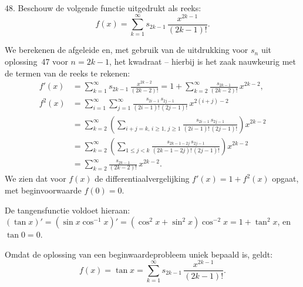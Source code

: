 \begin{problem}{48.}
    Beschouw de volgende functie uitgedrukt als reeks:
    \begin{equation*}
		f(x) = \textstyle\sum\limits_{k=1}^{\infty} s_{2k - 1}\, \frac{x^{2k - 1}}{(2k - 1)!}.
	\end{equation*}

    We berekenen de afgeleide en, met gebruik van de uitdrukking voor $s_n$ uit oplossing~47 voor $n = 2k - 1$, het kwadraat -- hierbij is het zaak nauwkeurig met de termen van de reeks te rekenen:
    \begin{equation*}
    \begin{split}
        f'(x)  & = \textstyle\sum\limits_{k=1}^{\infty} s_{2k - 1}\, \frac{x^{2k - 2}}{(2k - 2)!} = 1 + \textstyle\sum\limits_{k=2}^{\infty} \frac{s_{2k - 1}}{(2k - 2)!} \, x^{2k - 2}, \\
        f^2(x) & = \textstyle\sum\limits_{i=1}^{\infty} \textstyle\sum\limits_{j=1}^{\infty} \frac{s_{2i - 1}\, s_{2j - 1}}{(2i - 1)!\, (2j - 1)!} \, x^{2(i+j) - 2} \\
               & = \textstyle\sum\limits_{k=2}^{\infty} \left( \textstyle\sum\limits_{i+j=k,\, i \geq 1,\, j\geq 1} \frac{s_{2i - 1}\, s_{2j - 1}}{(2i - 1)!\, (2j - 1)!} \right) x^{2k - 2} \\
               & = \textstyle\sum\limits_{k=2}^{\infty} \left( \textstyle\sum\limits_{1 \leq j < k} \frac{s_{2k - 1 - 2j}\, s_{2j - 1}}{(2k - 1 - 2j)!\, (2j - 1)!} \right) x^{2k - 2} \\
               & = \textstyle\sum\limits_{k=2}^{\infty} \frac{s_{2k - 1}}{(2k - 2)!} \, x^{2k - 2}.
    \end{split}
    \end{equation*}
    We zien dat voor $f(x)$ de differentiaalvergelijking $f'(x) = 1 + f^2(x)$ opgaat, met beginvoorwaarde $f(0) = 0$.

    De tangensfunctie voldoet hieraan: $(\tan x)' = (\sin x \cos^{-1} x)' = (\cos^2 x + \sin^2 x) \cos^{-2} x = 1 + \tan^2 x$, en $\tan 0 = 0$.

    Omdat de oplossing van een beginwaardeprobleem uniek bepaald is, geldt:
    \begin{equation*}
		f(x) = \tan x = \textstyle\sum\limits_{k=1}^{\infty} s_{2k - 1}\, \frac{x^{2k - 1}}{(2k - 1)!}.
	\end{equation*}
\end{problem}

\clearpage


